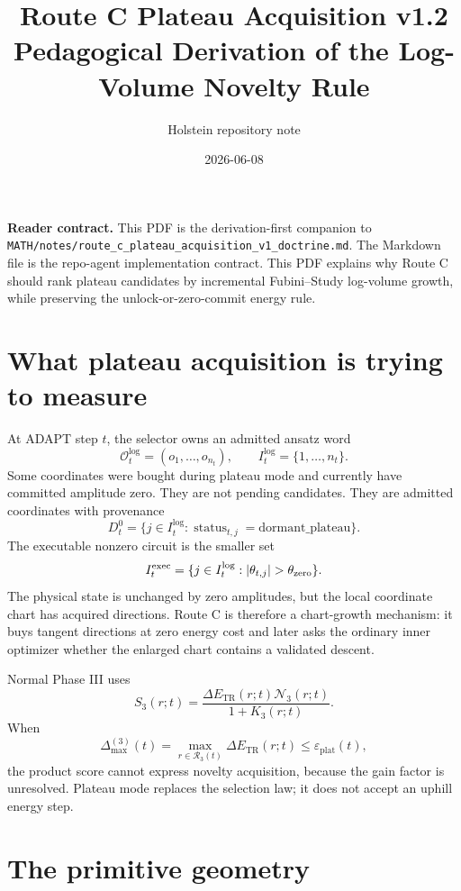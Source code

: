 \documentclass[10pt,twocolumn]{article}
\title{Route C Plateau Acquisition v1.2\\Pedagogical Derivation of the Log-Volume Novelty Rule}
\author{Holstein repository note}
\date{2026-06-08}
\newcommand{\eps}{\varepsilon}
\newcommand{\plat}{\mathrm{plat}}
\newcommand{\logi}{\mathrm{log}}
\newcommand{\exec}{\mathrm{exec}}
\newcommand{\tr}{\mathrm{TR}}
\begin{document}
\maketitle
\small
\raggedright

\textbf{Reader contract.} This PDF is the derivation-first companion to
\texttt{MATH/notes/route\_c\_plateau\_acquisition\_v1\_doctrine.md}. The
Markdown file is the repo-agent implementation contract. This PDF explains why
Route C should rank plateau candidates by incremental Fubini--Study log-volume
growth, while preserving the unlock-or-zero-commit energy rule.

\section{What plateau acquisition is trying to measure}

At ADAPT step $t$, the selector owns an admitted ansatz word
\[
\mathcal O_t^{\logi}=(o_1,\ldots,o_{n_t}),\qquad
I_t^{\logi}=\{1,
\ldots,n_t\}.
\]
Some coordinates were bought during plateau mode and currently have committed
amplitude zero. They are not pending candidates. They are admitted coordinates
with provenance
\[
D_t^0=\{j\in I_t^{\logi}:\operatorname{status}_{t,j}=\mathrm{dormant\_plateau}\}.
\]
The executable nonzero circuit is the smaller set
\[
I_t^{\exec}=\{j\in I_t^{\logi}:|\theta_{t,j}|>\theta_{\rm zero}\}.
\]
The physical state is unchanged by zero amplitudes, but the local coordinate
chart has acquired directions. Route C is therefore a chart-growth mechanism:
it buys tangent directions at zero energy cost and later asks the ordinary inner
optimizer whether the enlarged chart contains a validated descent.

Normal Phase III uses
\[
S_3(r;t)=\frac{\Delta E_{\tr}(r;t)\mathcal N_3(r;t)}{1+K_3(r;t)}.
\]
When
\[
\Delta_{\max}^{(3)}(t)=\max_{r\in\mathcal R_3(t)}\Delta E_{\tr}(r;t)
\le \eps_{\plat}(t),
\]
the product score cannot express novelty acquisition, because the gain factor is
unresolved. Plateau mode replaces the selection law; it does not accept an
uphill energy step.

\section{The primitive geometry}
\end{document}
